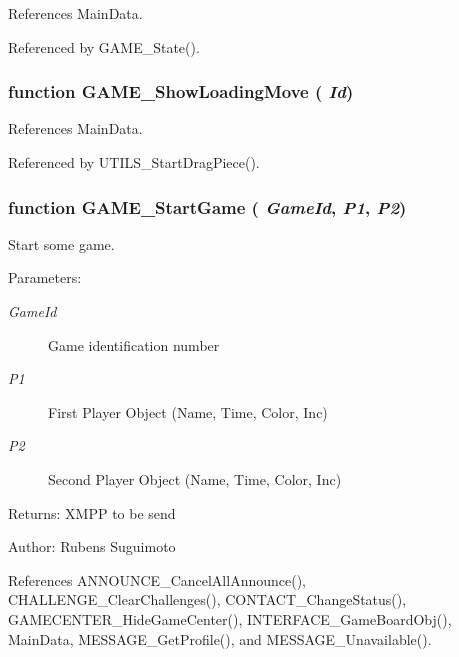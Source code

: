 References MainData.

Referenced by GAME\_\-State().
\subsubsection[GAME\_\-ShowLoadingMove]{\setlength{\rightskip}{0pt plus 5cm}function GAME\_\-ShowLoadingMove ( {\em Id})}\label{game_2game_8js_69251ba67f4faba48b572e46f7dfebf0}




References MainData.

Referenced by UTILS\_\-StartDragPiece().
\subsubsection[GAME\_\-StartGame]{\setlength{\rightskip}{0pt plus 5cm}function GAME\_\-StartGame ( {\em GameId}, \/   {\em P1}, \/   {\em P2})}\label{game_2game_8js_4c24312a468dff77ec76873422def6d6}


Start some game. 

\begin{Desc}
\item[Parameters:]
\begin{description}
\item[{\em GameId}]Game identification number \item[{\em P1}]First Player Object (Name, Time, Color, Inc) \item[{\em P2}]Second Player Object (Name, Time, Color, Inc) \end{description}
\end{Desc}
\begin{Desc}
\item[Returns:]XMPP to be send \end{Desc}
\begin{Desc}
\item[Author:]Rubens Suguimoto \end{Desc}


References ANNOUNCE\_\-CancelAllAnnounce(), CHALLENGE\_\-ClearChallenges(), CONTACT\_\-ChangeStatus(), GAMECENTER\_\-HideGameCenter(), INTERFACE\_\-GameBoardObj(), MainData, MESSAGE\_\-GetProfile(), and MESSAGE\_\-Unavailable().

